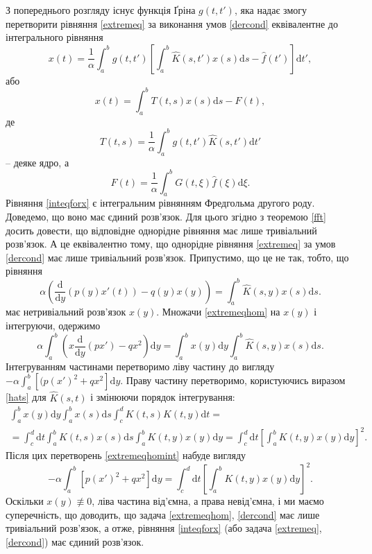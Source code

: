 \documentclass[14pt,twoside]{extreport}
\theoremstyle{mystyle}
\numberwithin{equation}{chapter}
\begin{document}
З попереднього розгляду існує функція Ґріна $g(t, t')$, яка надає змогу перетворити рівняння \eqref{extremeq} за виконання умов \eqref{dercond} еквівалентне до інтегрального рівняння
$$
x(t)=\frac{1}{\alpha}\int_{a}^{b}g(t, t')\left[\int_{a}^{b}\hat{K}(s, t')x(s)\mathrm{d}s-\hat{f}(t')\right]\mathrm{d}t',
$$
або
\begin{equation}\label{inteqforx}
	x(t)=\displaystyle \int_a^b T(t, s)x(s)\mathrm{d}s-F(t),
\end{equation}
де
$$
T(t, s)=\frac{1}{\alpha}\int_{a}^{b}g(t, t')\hat{K}(s, t')\mathrm{d}t'
$$
-- деяке ядро, а
$$
F(t)=\frac{1}{\alpha}\int_a^b G(t, \xi)\hat{f}(\xi)\mathrm{d}\xi.
$$
Рівняння \eqref{inteqforx} є інтегральним рівнянням Фредгольма другого роду. Доведемо, що воно має єдиний розв'язок. Для цього згідно з теоремою \ref{fft} досить довести, що відповідне однорідне рівняння має лише тривіальний розв'язок. А це еквівалентно тому, що однорідне рівняння \eqref{extremeq} за умов \eqref{dercond} має лише тривіальний розв'язок. Припустимо, що це не так, тобто, що рівняння
\begin{equation}\label{extremeqhom}
\displaystyle \alpha\left(\frac{\mathrm{d}}{\mathrm{d}y}(p(y)x'(t))-q(y)x(y)\right)=\int_{a}^{b}\hat{K}(s, y)x(s)\mathrm{d}s.
\end{equation}
має нетривіальний розв'язок $x(y)$. Множачи \eqref{extremeqhom} на $x(y)$ і інтегруючи, одержимо
\begin{equation}\label{extremeqhomint}
\displaystyle \alpha\int_{a}^{b}\left(x\frac{\mathrm{d}}{\mathrm{d}y}(px')-qx^2\right)\mathrm{d}y=\int_{a}^{b}x(y)\mathrm{d}y\int_{a}^{b}\hat{K}(s, y)x(s)\mathrm{d}s.
\end{equation}
Інтегруванням частинами перетворимо ліву частину до вигляду
$-\displaystyle \alpha\int_{a}^{b}[(p(x')^{2}+qx^{2}]\mathrm{d}y$.
Праву частину перетворимо, користуючись виразом \eqref{hats} для $\hat{K}(s, t)$ і змінюючи порядок інтегрування:
\begin{multline*}
\int_{a}^{b}x(y)\mathrm{d}y\int_{a}^{b}x(s)\mathrm{d}s\int_{c}^{d}K(t, s)K(t, y)\mathrm{d}t=\\
=\displaystyle \int_{c}^{d}\mathrm{d}t \int_{a}^{b}K(t, s)x(s)\mathrm{d}s\int_{a}^{b}K(t, y)x(y)\mathrm{d}y = \int_{c}^{d}\mathrm{d}t\left[\int_{a}^{b}K(t, y)x(y)\mathrm{d}y\right]^2.
\end{multline*}
Після цих перетворень \eqref{extremeqhomint} набуде вигляду
$$
-\alpha\int_{a}^{b}[p(x')^{2}+qx^{2}]\mathrm{d}y=\int_{c}^{d}\mathrm{d}t\left[\int_{a}^{b}K(t, y)x(y)\mathrm{d}y\right]^2.
$$
Оскільки $x(y) \not\equiv 0$, ліва частина від'ємна, а права невід'ємна, і ми маємо суперечність, що доводить, що задача \eqref{extremeqhom}, \eqref{dercond} має лише тривіальний розв'язок, а отже, рівняння \eqref{inteqforx} (або задача \eqref{extremeq}, \eqref{dercond}) має єдиний розв'язок.
\end{document}
